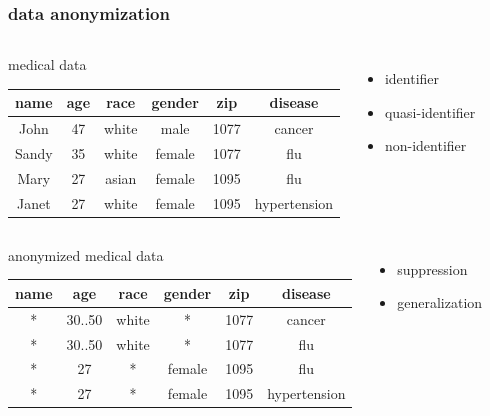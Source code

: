 \documentclass{beamer}
\begin{document}
\begin{frame}
  \frametitle{data anonymization}  
  \begin{columns} 
    \begin{block}{medical data}
      \vspace{10pt} 
      \tiny
      \begin{tabular}{ c|c|c|c|c|c }
        \textbf{name} & \textbf{age} & \textbf{race} & \textbf{gender} & \textbf{zip} & \textbf{disease} \\
        \hline
	\color{orange} John & 47 & white & male & 1077 & \color{violet} cancer \\
        \hline
	\color{orange} Sandy & 35 & white & female & 1077 & \color{violet} flu \\
        \hline
	\color{orange} Mary & 27 & asian & female & 1095 & \color{violet} flu \\
        \hline
	\color{orange} Janet & 27 & white & female & 1095 & \color{violet} hypertension 
      \end{tabular}
    \end{block}   
    \begin{itemize}
      \item{\color{orange} identifier}
      \item quasi-identifier
      \item{\color{violet} non-identifier}
    \end{itemize}
  \end{columns} 
  \vspace{20pt}
  \begin{columns}
    \begin{block}{anonymized medical data}
      \vspace{10pt}
      \tiny
        \begin{tabular}{ c|c|c|c|c|c }
        \textbf{name} & \textbf{age} & \textbf{race} & \textbf{gender} & \textbf{zip} & \textbf{disease} \\
        \hline
	\color{red} * & \color{blue} 30..50 & white & \color{red} * & 1077 & cancer \\
        \hline
        \color{red} * & \color{blue} 30..50 & white & \color{red} * & 1077 & flu \\
        \hline
        \color{red} * & 27 & \color{red} * & female & 1095 & flu \\
        \hline
        \color{red} * & 27 & \color{red} * & female & 1095 & hypertension 	
      \end{tabular} 
    \end{block}
    \begin{itemize}
      \item{\color{red} suppression}
      \item{\color{blue} generalization}
    \end{itemize}
  \end{columns}    
\end{frame}
\end{document}
